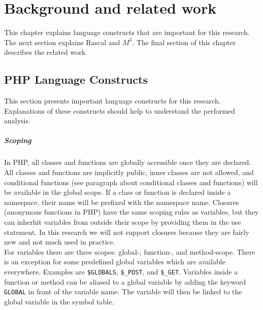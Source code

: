 \documentclass[../main.tex]{subfiles}
\begin{document}
    \chapter{Background and related work}\label{chap:background}
    This chapter explains language constructs that are important for this research.
    The next section explains Rascal and $M^3$.
    The final section of this chapter describes the related work.

    \section{PHP Language Constructs}\label{sec:PHP_Language_Constructs}
    This section presents important language constructs for this research.
    Explanations of these constructs should help to understand the performed analysis.
    
    \paragraph{Scoping}
    In PHP, all classes and functions are globally accessible once they are declared.
    All classes and functions are implicitly public, inner classes are not allowed, and conditional functions (see paragraph about conditional classes and functions) will be available in the global scope.
    If a class or function is declared inside a namespace, their name will be prefixed with the namespace name.
    Closures (anonymous functions in PHP) have the same scoping rules as variables, but they can inherhit variables from outside their scope by providing them in the use statement. 
    In this research we will not support closures because they are fairly new and not much used in practice. 
    \\
    For variables there are three scopes: global-, function-, and method-scope. 
    There is an exception for some predefined global variables which are available everywhere. 
    Examples are \texttt{\$GLOBALS}, \texttt{\$\_POST}, and \texttt{\$\_GET}. 
    Variables inside a function or method can be aliased to a global variable by adding the keyword \texttt{GLOBAL} in front of the variable name.
    The variable will then be linked to the global variable in the symbol table\footnotemark.
    
\end{document}
